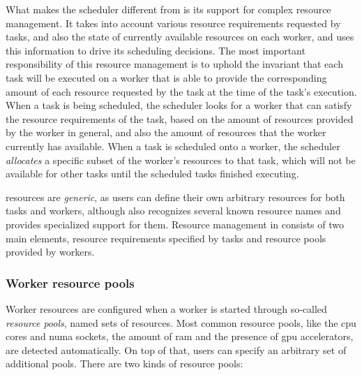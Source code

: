 What makes the scheduler different from \rsds{} is its support for complex resource
management. It takes into account various resource requirements requested by tasks, and also the
state of currently available resources on each worker, and uses this information to drive its
scheduling decisions. The most important responsibility of this resource management is to uphold
the invariant that each task will be executed on a worker that is able to provide the corresponding
amount of each resource requested by the task at the time of the task's execution. When a task is
being scheduled, the scheduler looks for a worker that can satisfy the resource requirements of the
task, based on the amount of resources provided by the worker in general, and also the amount of
resources that the worker currently has available. When a task is scheduled onto a worker, the
scheduler \emph{allocates} a specific subset of the worker's resources to that task, which
will not be available for other tasks until the scheduled tasks finished executing.

\hyperqueue{} resources are \emph{generic}, as users can define their own
arbitrary resources for both tasks and workers, although \hq{} also recognizes
several known resource names and provides specialized support for them. Resource management in
\hyperqueue{} consists of two main elements, resource requirements specified by tasks and
resource pools provided by workers.

\subsubsection*{Worker resource pools}
Worker resources are configured when a worker is started through so-called \emph{resource pools},
named sets of resources. Most common resource pools, like the \gls{cpu} cores and
\gls{numa} sockets, the amount of \gls{ram} and the presence of
\gls{gpu} accelerators, are detected automatically. On top of that, users can specify
an arbitrary set of additional pools. There are two kinds of resource pools:

